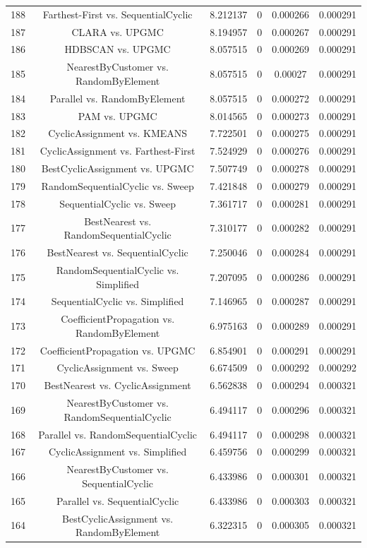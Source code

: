 \documentclass[a4paper,10pt]{article}
\begin{document}
\begin{landscape}
\begin{table}[!htp]
\begin{tabular}{cccccc}
188&Farthest-First vs. SequentialCyclic&8.212137&0&0.000266&0.000291\\
187&CLARA vs. UPGMC&8.194957&0&0.000267&0.000291\\
186&HDBSCAN vs. UPGMC&8.057515&0&0.000269&0.000291\\
185&NearestByCustomer vs. RandomByElement&8.057515&0&0.00027&0.000291\\
184&Parallel vs. RandomByElement&8.057515&0&0.000272&0.000291\\
183&PAM vs. UPGMC&8.014565&0&0.000273&0.000291\\
182&CyclicAssignment vs. KMEANS&7.722501&0&0.000275&0.000291\\
181&CyclicAssignment vs. Farthest-First&7.524929&0&0.000276&0.000291\\
180&BestCyclicAssignment vs. UPGMC&7.507749&0&0.000278&0.000291\\
179&RandomSequentialCyclic vs. Sweep&7.421848&0&0.000279&0.000291\\
178&SequentialCyclic vs. Sweep&7.361717&0&0.000281&0.000291\\
177&BestNearest vs. RandomSequentialCyclic&7.310177&0&0.000282&0.000291\\
176&BestNearest vs. SequentialCyclic&7.250046&0&0.000284&0.000291\\
175&RandomSequentialCyclic vs. Simplified&7.207095&0&0.000286&0.000291\\
174&SequentialCyclic vs. Simplified&7.146965&0&0.000287&0.000291\\
173&CoefficientPropagation vs. RandomByElement&6.975163&0&0.000289&0.000291\\
172&CoefficientPropagation vs. UPGMC&6.854901&0&0.000291&0.000291\\
171&CyclicAssignment vs. Sweep&6.674509&0&0.000292&0.000292\\
170&BestNearest vs. CyclicAssignment&6.562838&0&0.000294&0.000321\\
169&NearestByCustomer vs. RandomSequentialCyclic&6.494117&0&0.000296&0.000321\\
168&Parallel vs. RandomSequentialCyclic&6.494117&0&0.000298&0.000321\\
167&CyclicAssignment vs. Simplified&6.459756&0&0.000299&0.000321\\
166&NearestByCustomer vs. SequentialCyclic&6.433986&0&0.000301&0.000321\\
165&Parallel vs. SequentialCyclic&6.433986&0&0.000303&0.000321\\
164&BestCyclicAssignment vs. RandomByElement&6.322315&0&0.000305&0.000321\\

\end{tabular}
\end{table}
\end{landscape}
\end{document}

